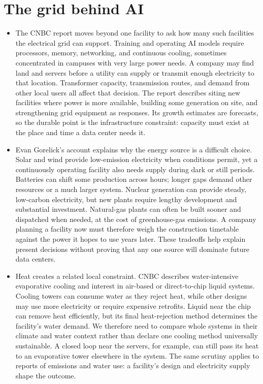 \documentclass[10pt]{article}
\begin{document}
\newpage
\section*{The grid behind AI}

\begin{itemize}[leftmargin=1.25em, itemsep=0.3em, parsep=0pt, topsep=0pt]
    \item The CNBC report moves beyond one facility to ask how many such facilities the electrical grid can support. Training and operating AI models require processors, memory, networking, and continuous cooling, sometimes concentrated in campuses with very large power needs. A company may find land and servers before a utility can supply or transmit enough electricity to that location. Transformer capacity, transmission routes, and demand from other local users all affect that decision. The report describes siting new facilities where power is more available, building some generation on site, and strengthening grid equipment as responses. Its growth estimates are forecasts, so the durable point is the infrastructure constraint: capacity must exist at the place and time a data center needs it.

    \item Evan Gorelick's account explains why the energy source is a difficult choice. Solar and wind provide low-emission electricity when conditions permit, yet a continuously operating facility also needs supply during dark or still periods. Batteries can shift some production across hours; longer gaps demand other resources or a much larger system. Nuclear generation can provide steady, low-carbon electricity, but new plants require lengthy development and substantial investment. Natural-gas plants can often be built sooner and dispatched when needed, at the cost of greenhouse-gas emissions. A company planning a facility now must therefore weigh the construction timetable against the power it hopes to use years later. These tradeoffs help explain present decisions without proving that any one source will dominate future data centers.

    \item Heat creates a related local constraint. CNBC describes water-intensive evaporative cooling and interest in air-based or direct-to-chip liquid systems. Cooling towers can consume water as they reject heat, while other designs may use more electricity or require expensive retrofits. Liquid near the chip can remove heat efficiently, but its final heat-rejection method determines the facility's water demand. We therefore need to compare whole systems in their climate and water context rather than declare one cooling method universally sustainable. A closed loop near the servers, for example, can still pass its heat to an evaporative tower elsewhere in the system. The same scrutiny applies to reports of emissions and water use: a facility's design and electricity supply shape the outcome.


\end{itemize}
\end{document}
